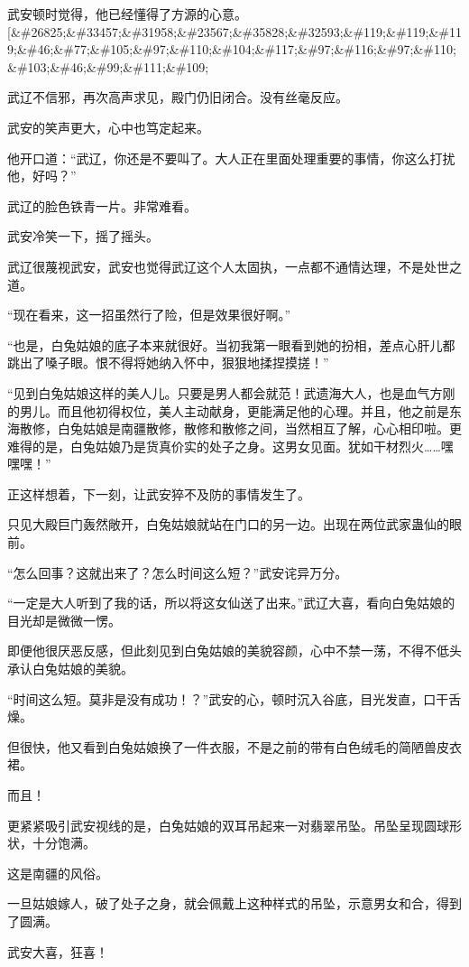 \begin{this_body}
武安顿时觉得，他已经懂得了方源的心意。[\&\#26825;\&\#33457;\&\#31958;\&\#23567;\&\#35828;\&\#32593;\&\#119;\&\#119;\&\#119;\&\#46;\&\#77;\&\#105;\&\#97;\&\#110;\&\#104;\&\#117;\&\#97;\&\#116;\&\#97;\&\#110;\&\#103;\&\#46;\&\#99;\&\#111;\&\#109;

武辽不信邪，再次高声求见，殿门仍旧闭合。没有丝毫反应。

武安的笑声更大，心中也笃定起来。

他开口道：“武辽，你还是不要叫了。大人正在里面处理重要的事情，你这么打扰他，好吗？”

武辽的脸色铁青一片。非常难看。

武安冷笑一下，摇了摇头。

武辽很蔑视武安，武安也觉得武辽这个人太固执，一点都不通情达理，不是处世之道。

“现在看来，这一招虽然行了险，但是效果很好啊。”

“也是，白兔姑娘的底子本来就很好。当初我第一眼看到她的扮相，差点心肝儿都跳出了嗓子眼。恨不得将她纳入怀中，狠狠地揉捏摸搓！”

“见到白兔姑娘这样的美人儿。只要是男人都会就范！武遗海大人，也是血气方刚的男儿。而且他初得权位，美人主动献身，更能满足他的心理。并且，他之前是东海散修，白兔姑娘是南疆散修，散修和散修之间，当然相互了解，心心相印啦。更难得的是，白兔姑娘乃是货真价实的处子之身。这男女见面。犹如干材烈火……嘿嘿嘿！”

正这样想着，下一刻，让武安猝不及防的事情发生了。

只见大殿巨门轰然敞开，白兔姑娘就站在门口的另一边。出现在两位武家蛊仙的眼前。

“怎么回事？这就出来了？怎么时间这么短？”武安诧异万分。

“一定是大人听到了我的话，所以将这女仙送了出来。”武辽大喜，看向白兔姑娘的目光却是微微一愣。

即便他很厌恶反感，但此刻见到白兔姑娘的美貌容颜，心中不禁一荡，不得不低头承认白兔姑娘的美貌。

“时间这么短。莫非是没有成功！？”武安的心，顿时沉入谷底，目光发直，口干舌燥。

但很快，他又看到白兔姑娘换了一件衣服，不是之前的带有白色绒毛的简陋兽皮衣裙。

而且！

更紧紧吸引武安视线的是，白兔姑娘的双耳吊起来一对翡翠吊坠。吊坠呈现圆球形状，十分饱满。

这是南疆的风俗。

一旦姑娘嫁人，破了处子之身，就会佩戴上这种样式的吊坠，示意男女和合，得到了圆满。

武安大喜，狂喜！


\end{this_body}
